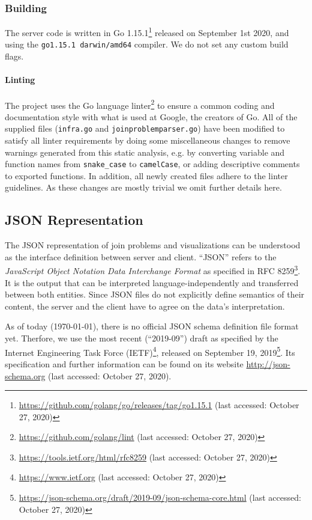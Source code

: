 \subsubsection{Building}

The server code is written in Go 1.15.1\footnote{\url{https://github.com/golang/go/releases/tag/go1.15.1} (last accessed: October 27, 2020)} released on September 1st 2020, and using the \texttt{go1.15.1 darwin/amd64} compiler. We do not set any custom build flags.

\paragraph{Linting} The project uses the Go language linter\footnote{\url{https://github.com/golang/lint} (last accessed: October 27, 2020)} to ensure a common coding and documentation style with what is used at Google, the creators of Go.
All of the supplied files (\texttt{infra.go} and \texttt{joinproblemparser.go}) have been modified to satisfy all linter requirements by doing some miscellaneous changes to remove warnings generated from this static analysis, e.g. by converting variable and function names from \texttt{snake\_case} to \texttt{camelCase}, or adding descriptive comments to exported functions. In addition, all newly created files adhere to the linter guidelines. As these changes are mostly trivial we omit further details here. 

\subsection{JSON Representation}
\label{sub:json-representation}

The JSON representation of join problems and visualizations can be understood as the interface definition between server and client. 
``JSON'' refers to the \textit{JavaScript Object Notation Data Interchange Format} as specified in RFC 8259\footnote{\url{https://tools.ietf.org/html/rfc8259} (last accessed: October 27, 2020)}.
It is the output that can be interpreted language-independently and transferred between both entities. Since JSON files do not explicitly define semantics of their content, the server and the client have to agree on the data's interpretation.

As of today (\today), there is no official JSON schema definition file format yet. Therfore, we use the most recent (``2019-09'') draft as specified by the Internet Engineering Task Force (IETF)\footnote{\url{https://www.ietf.org} (last accessed: October 27, 2020)}, released on September 19, 2019\footnote{\url{https://json-schema.org/draft/2019-09/json-schema-core.html} (last accessed: October 27, 2020)}. Its specification and further information can be found on its website \url{http://json-schema.org} (last accessed: October 27, 2020).

